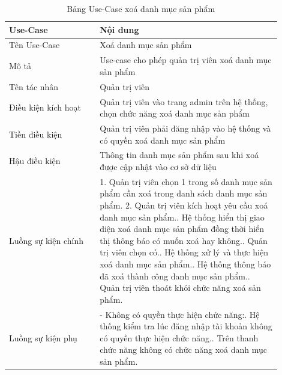 \begin{longtable}[htp]{ |m{0.3\linewidth}|m{0.6\linewidth}|}
 \caption{Bảng Use-Case xoá danh mục sản phẩm \label{long}}\\
 \hline
 Use-Case & Nội dung \\
 \hline
 Tên Use-Case & Xoá danh mục sản phẩm \\
 \hline
 Mô tả & Use-case cho phép quản trị viên xoá danh mục sản phẩm\\
 \hline
 Tên tác nhân & Quản trị viên\\
 \hline
 Điều kiện kích hoạt & Quản trị viên vào trang admin trên hệ thống, chọn chức năng xoá danh mục sản phẩm\\
 \hline
 Tiền điều kiện & Quản trị viên phải đăng nhập vào hệ thống và có quyền xoá danh mục sản phẩm\\
 \hline
 Hậu điều kiện & Thông tin danh mục sản phẩm sau khi xoá được cập nhật vào cơ sở dữ liệu\\
 \hline
 Luồng sự kiện chính & 
 1. Quản trị viên chọn 1 trong số danh mục sản phẩm cần xoá trong danh sách danh mục sản phẩm.
 2. Quản trị viên kích hoạt yêu cầu xoá danh mục sản phẩm.\newline
 3. Hệ thống hiển thị giao diện xoá danh mục sản phẩm đồng thời hiển thị thông báo có muốn xoá hay không.\newline
 4. Quản trị viên chọn có.\newline
 5. Hệ thống xử lý và thực hiện xoá danh mục sản phẩm.\newline
 6. Hệ thống thông báo đã xoá thành công danh mục sản phẩm.\newline	
 7. Quản trị viên thoát khỏi chức năng xoá sản phẩm.
 \\
 \hline
 Luồng sự kiện phụ & 
  - Không có quyền thực hiện chức năng:\newline
  1. Hệ thống kiểm tra lúc đăng nhập tài khoản không có quyền thực hiện chức năng.\newline
  2. Trên thanh chức năng không có chức năng xoá danh mục sản phẩm.
 \\
 \hline
\end{longtable}

